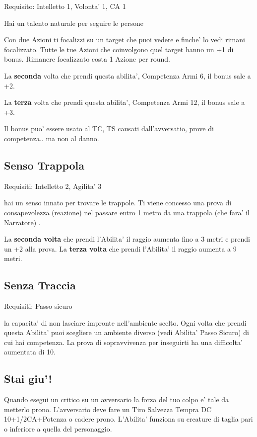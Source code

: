\documentclass[a4paper,11pt,twoside,openany]{dndbook}
\begin{document}
Requisito: Intelletto 1, Volonta' 1, CA 1

Hai un talento naturale per seguire le persone

Con due Azioni ti focalizzi su un target che puoi vedere e finche' lo vedi rimani focalizzato. Tutte le tue Azioni che coinvolgono quel target hanno un +1 di bonus. Rimanere focalizzato costa 1 Azione per round.

La \textbf{seconda} volta che prendi questa abilita', Competenza Armi 6, il bonus sale a +2.

La \textbf{terza} volta che prendi questa abilita', Competenza Armi 12, il bonus sale a +3.

Il bonus puo' essere usato al TC, TS causati dall'avversatio, prove di competenza.. ma non al danno.

\subsection{Senso Trappola}

Requisiti: Intelletto 2, Agilita' 3

hai un senso innato per trovare le trappole. Ti viene concesso una prova di consapevolezza (reazione) nel passare entro 1 metro da una trappola (che fara' il Narratore) .

La \textbf{seconda volta} che prendi l'Abilita' il raggio aumenta fino a 3 metri e prendi un +2 alla prova. La \textbf{terza volta} che prendi l'Abilita' il raggio aumenta a 9 metri.

\subsection{Senza Traccia}

Requisiti: Passo sicuro

la capacita' di non lasciare impronte nell'ambiente scelto. Ogni volta che prendi questa Abilita' puoi scegliere un ambiente diverso (vedi Abilita' Passo Sicuro) di cui hai competenza. La prova di sopravvivenza per inseguirti ha una difficolta' aumentata di 10.

\subsection{Stai giu'!}

Quando esegui un critico su un avversario la forza del tuo colpo e' tale da metterlo prono. L'avversario deve fare un Tiro Salvezza Tempra DC 10+1/2CA+Potenza o cadere prono. L'Abilita' funziona su creature di taglia pari o inferiore a quella del personaggio.
\end{document}
